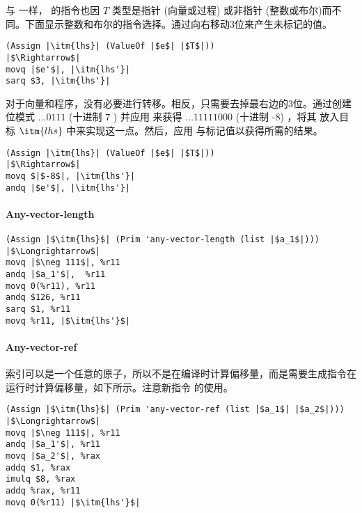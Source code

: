 \documentclass[11pt]{book}
\begin{document}
与  一样，  的指令也因 $T$ 类型是指针 (向量或过程)
或非指针 (整数或布尔)而不同。下面显示整数和布尔的指令选择。通过向右移动3位来产生未标记的值。
\begin{lstlisting}
(Assign |\itm{lhs}| (ValueOf |$e$| |$T$|))
|$\Rightarrow$|
movq |$e'$|, |\itm{lhs'}|
sarq $3, |\itm{lhs'}|
\end{lstlisting}
%
对于向量和程序，没有必要进行转移。相反，只需要去掉最右边的3位。通过创建位模式 $\ldots 0111$ (十进制 $7$ ) 并应用  来获得 $\ldots 11111000$ (十进制 -8) ，将其  放入目标 $\itm{lhs}$ 中来实现这一点。然后，应用  与标记值以获得所需的结果。 \\
\begin{lstlisting}
(Assign |\itm{lhs}| (ValueOf |$e$| |$T$|))
|$\Rightarrow$|
movq $|$-8$|, |\itm{lhs'}|
andq |$e'$|, |\itm{lhs'}|
\end{lstlisting}


\paragraph{Any-vector-length}

\begin{lstlisting}
(Assign |$\itm{lhs}$| (Prim 'any-vector-length (list |$a_1$|)))
|$\Longrightarrow$|
movq |$\neg 111$|, %r11
andq |$a_1'$|,  %r11
movq 0(%r11), %r11
andq $126, %r11
sarq $1, %r11
movq %r11, |$\itm{lhs'}$|
\end{lstlisting}

\paragraph{Any-vector-ref}

索引可以是一个任意的原子，所以不是在编译时计算偏移量，而是需要生成指令在运行时计算偏移量，如下所示。注意新指令 的使用。
\begin{center}
\begin{minipage}{0.96\textwidth}
\begin{lstlisting}
(Assign |$\itm{lhs}$| (Prim 'any-vector-ref (list |$a_1$| |$a_2$|)))
|$\Longrightarrow$|
movq |$\neg 111$|, %r11
andq |$a_1'$|, %r11
movq |$a_2'$|, %rax
addq $1, %rax
imulq $8, %rax
addq %rax, %r11
movq 0(%r11) |$\itm{lhs'}$|
\end{lstlisting}
\end{minipage}
\end{center}
\end{document}

